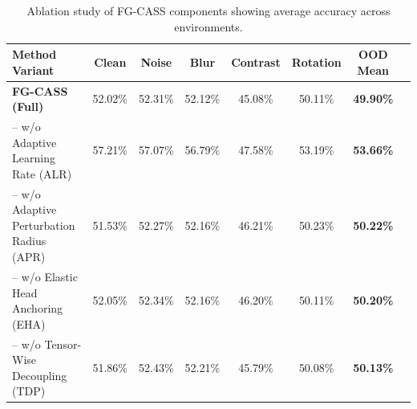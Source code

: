 \documentclass{article}
\theoremstyle{plain}
\theoremstyle{definition}
\theoremstyle{remark}
\begin{document}
\begin{table}[t]
\caption{Ablation study of FG-CASS components showing average accuracy across environments.}
\label{tab:ablation}
\vskip 0.15in
\begin{center}
\begin{small}
\begin{sc}
\begin{tabular}{lccccccc}
\toprule
Method Variant & Clean & Noise & Blur & Contrast & Rotation & OOD Mean \\
\midrule
\textbf{FG-CASS (Full)} & 52.02\% & 52.31\% & 52.12\% & 45.08\% & 50.11\% & \textbf{49.90\%} \\
\quad -- w/o Adaptive Learning Rate (ALR) & 57.21\% & 57.07\% & 56.79\% & 47.58\% & 53.19\% & \textbf{53.66\%} \\
\quad -- w/o Adaptive Perturbation Radius (APR) & 51.53\% & 52.27\% & 52.16\% & 46.21\% & 50.23\% & \textbf{50.22\%} \\
\quad -- w/o Elastic Head Anchoring (EHA) & 52.05\% & 52.34\% & 52.16\% & 46.20\% & 50.11\% & \textbf{50.20\%} \\
\quad -- w/o Tensor-Wise Decoupling (TDP) & 51.86\% & 52.43\% & 52.21\% & 45.79\% & 50.08\% & \textbf{50.13\%} \\
\bottomrule
\end{tabular}
\end{sc}
\end{small}
\end{center}
\vskip -0.1in
\end{table}
\end{document}
